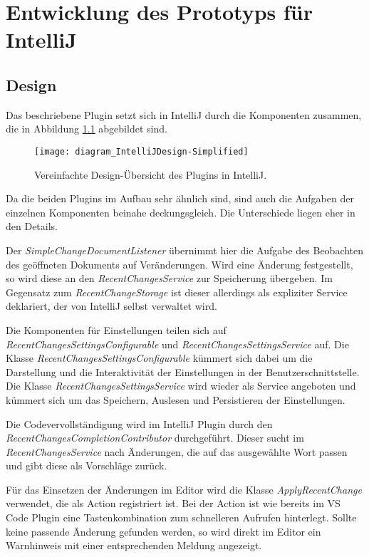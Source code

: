 \chapter{Entwicklung des Prototyps für IntelliJ}
\label{cha:EntwicklungIntelliJ}

\section{Design}
\label{sec:EntwicklungIntelliJ_Design}

Das beschriebene Plugin setzt sich in IntelliJ 
durch die Komponenten zusammen,
die in Abbildung \ref{fig:diagram_IntelliJDesign-Simplified} 
abgebildet sind.

\begin{figure}
    \centering
    \texttt{[image: diagram\_IntelliJDesign-Simplified]}
    \caption{Vereinfachte Design-Übersicht des Plugins in IntelliJ.}
    \label{fig:diagram_IntelliJDesign-Simplified}
\end{figure}

Da die beiden Plugins im Aufbau sehr ähnlich sind, sind auch die Aufgaben der
einzelnen Komponenten beinahe deckungsgleich. Die Unterschiede liegen eher in
den Details.

Der \emph{SimpleChangeDocumentListener} übernimmt hier die Aufgabe
des Beobachten des geöffneten Dokuments auf Veränderungen. Wird
eine Änderung festgestellt, so wird diese an den \emph{RecentChangesService}
zur Speicherung übergeben. Im Gegensatz zum \emph{RecentChangeStorage}
ist dieser allerdings als expliziter Service deklariert, der von IntelliJ
selbst verwaltet wird.

Die Komponenten für Einstellungen teilen sich auf 
\emph{RecentChangesSettingsConfigurable} und \emph{RecentChangesSettingsService}
auf. Die Klasse \emph{RecentChangesSettingsConfigurable} kümmert sich dabei
um die Darstellung und die Interaktivität der Einstellungen in der Benutzerschnittstelle.
Die Klasse \emph{RecentChangesSettingsService} wird wieder als Service 
angeboten und kümmert sich um das Speichern, Auslesen und Persistieren
der Einstellungen.

Die Codevervollständigung wird im IntelliJ Plugin durch den
\emph{RecentChangesCompletionContributor} durchgeführt. Dieser
sucht im \emph{RecentChangesService} nach Änderungen, die auf
das ausgewählte Wort passen und gibt diese als Vorschläge zurück.

Für das Einsetzen der Änderungen im Editor wird die Klasse
\emph{ApplyRecentChange} verwendet, die als Action registriert ist.
Bei der Action ist wie bereits im VS Code Plugin eine Tastenkombination
zum schnelleren Aufrufen hinterlegt.
Sollte keine passende Änderung gefunden werden, so wird direkt im
Editor ein Warnhinweis mit einer entsprechenden Meldung angezeigt.

